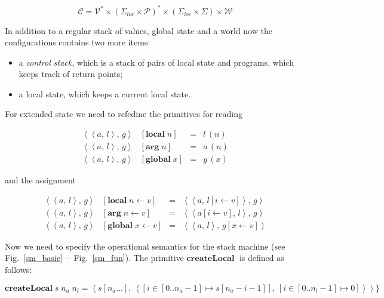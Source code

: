 \documentclass{article}
\newcommand{\inbr}[1]{\left<{#1}\right>}
\newcommand{\primi}[2]{\mathbf{#1}\;{#2}}
\theoremstyle{definition}
\begin{document}
\[
\mathscr C = \mathscr V^* \times (\Sigma_{loc}\times\mathscr P)^* \times (\Sigma_{loc} \times \Sigma) \times \mathscr W
\]

In addition to a regular stack of values, global state and a world now the configurations contains two more
items:

\begin{itemize}
\item a \emph{control stack}, which is a stack of pairs of local state and programs, which keeps track of
  return points;
\item a local state, which keeps a current local state.
\end{itemize}

For extended state we need to refedine the primitives for reading

\[
\begin{array}{rlcl}
  \inbr{\inbr{a,\,l},\,g} &[\primi{local}{n}] & = & l\,(n)\\
  \inbr{\inbr{a,\,l},\,g} &[\primi{arg}{n}] & = & a\,(n)\\
  \inbr{\inbr{a,\,l},\,g} &[\primi{global}{x}] & = & g\,(x)
  \end{array}
\]

and the assignment

\[
\begin{array}{rlcl}
  \inbr{\inbr{a,\,l},\,g} &[\primi{local}{n}\gets v]  & = & \inbr{\inbr{a,\,l[i\gets v]},\,g}\\
  \inbr{\inbr{a,\,l},\,g} &[\primi{arg}{n}\gets v]    & = & \inbr{\inbr{a[i\gets v],\,l},\,g}\\
  \inbr{\inbr{a,\,l},\,g} &[\primi{global}{x}\gets v] & = & \inbr{\inbr{a,\,l},\,g[x\gets v]}
  \end{array}
\]

Now we need to specify the operational semantics for the stack machine (see Fig.~\ref{sm_basic}~-- Fig.~\ref{sm_fun}).
The primitive $\primi{createLocal}{}$ is defined as follows:

\[
\primi{createLocal}{s\;n_a\;n_l}=\inbr{s[n_a...],\,\inbr{[i\in[0..n_a-1]\mapsto s[n_a-i-1]],\,[i\in[0..n_l-1]\mapsto 0]}}\}
\]
\end{document}
